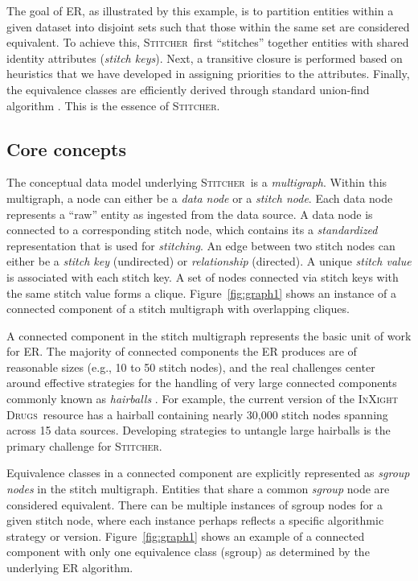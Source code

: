 \documentclass{bmcart}
\newcommand\st{\textsc{Stitcher}}
\newcommand\ix{\textsc{InXight Drugs}}
\begin{document}
The goal of ER, as illustrated by this example, is to partition
entities within a given dataset into disjoint sets such that those
within the same set are considered equivalent. To achieve this,
\st\ first ``stitches'' together entities with shared identity
attributes (\emph{stitch keys}). Next, a transitive closure is
performed based on heuristics that we have developed in assigning
priorities to the attributes. Finally, the equivalence classes are
efficiently derived through standard  union-find algorithm
\cite{Cormen2001}. This is the essence of \st.

\subsection*{Core concepts}
The conceptual data model underlying \st\ is a \emph{multigraph}.
Within this multigraph, a node can either be a \emph{data node} or a
\emph{stitch node}. Each data node represents a ``raw'' entity as
ingested from the data source.  A data node is connected to a
corresponding stitch node, which contains its a \emph{standardized}
representation that is used for \emph{stitching}. An edge between two
stitch nodes can either be a \emph{stitch key} (undirected) or
\emph{relationship} (directed). A unique \emph{stitch value} is
associated with each stitch key. A set of nodes connected via stitch
keys with the same stitch value forms a clique.
Figure~\ref{fig:graph1} shows an instance of a connected component of
a stitch multigraph with overlapping cliques. 

A connected component in the stitch multigraph represents the basic
unit of work for ER. The majority of connected components the ER produces 
are of reasonable sizes (e.g., 10 to 50 stitch nodes), and the
real challenges center around effective strategies for the handling of very
large connected components commonly known
as \emph{hairballs} \cite{Croset2015}. For example, the current
version of the \ix\ resource has a hairball containing nearly 30,000 stitch
nodes spanning across 15 data sources. Developing strategies to
untangle large hairballs is the primary challenge for \st.

Equivalence classes in a connected component are explicitly
represented as \emph{sgroup nodes} in the stitch multigraph. Entities
that share a common \emph{sgroup} node are considered equivalent.
There can be multiple instances of sgroup nodes for a given stitch
node, where each instance perhaps reflects a specific algorithmic 
strategy or version. Figure~\ref{fig:graph1} shows an example of 
a connected component with only one equivalence class (sgroup) as determined 
by the underlying ER algorithm. 
\end{document}
